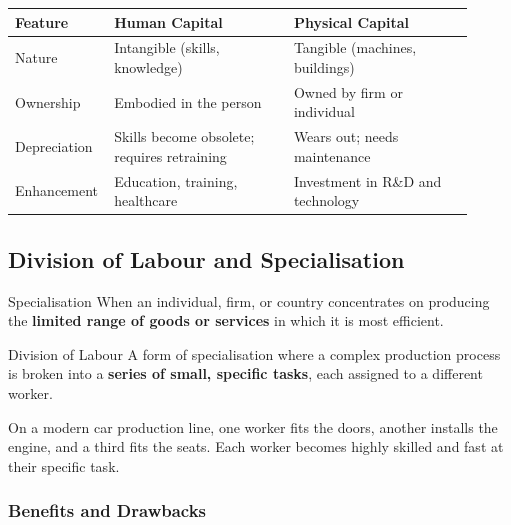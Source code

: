 \documentclass[11pt, a4paper, twoside]{book}
\begin{document}
\begin{tcolorbox}[
  enhanced, colback=LightBlue, colframe=NavyPrimary,
  arc=0pt, boxrule=0.7pt, left=4pt, right=4pt
]
\begin{tabular}{@{}>{\RaggedRight\arraybackslash}p{0.15\linewidth}>{\RaggedRight\arraybackslash}p{0.38\linewidth}>{\RaggedRight\arraybackslash}p{0.38\linewidth}@{}}
\textbf{\color{NavyPrimary}Feature} & \textbf{\color{NavyPrimary}Human Capital} & \textbf{\color{NavyPrimary}Physical Capital} \\
\midrule
Nature & Intangible (skills, knowledge) & Tangible (machines, buildings) \\
Ownership & Embodied in the person & Owned by firm or individual \\
Depreciation & Skills become obsolete; requires retraining & Wears out; needs maintenance \\
Enhancement & Education, training, healthcare & Investment in R\&D and technology \\
\end{tabular}
\end{tcolorbox}

\subsection{Division of Labour and Specialisation}

\begin{keyterm}{Specialisation}
When an individual, firm, or country concentrates on producing the \textbf{limited range of goods or services} in which it is most efficient.
\end{keyterm}

\begin{keyterm}{Division of Labour}
A form of specialisation where a complex production process is broken into a \textbf{series of small, specific tasks}, each assigned to a different worker.
\end{keyterm}

\begin{example}
On a modern car production line, one worker fits the doors, another installs the engine, and a third fits the seats. Each worker becomes highly skilled and fast at their specific task.
\end{example}

\subsubsection{Benefits and Drawbacks}
\end{document}
